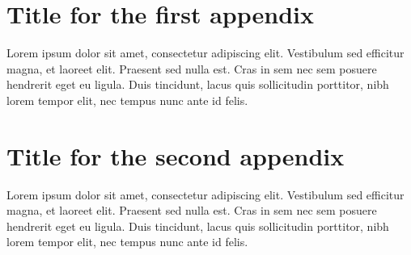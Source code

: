 \chapter{Title for the first appendix}
\label{appendixA}

Lorem ipsum dolor sit amet, consectetur adipiscing elit. Vestibulum sed efficitur magna, et laoreet elit. Praesent sed nulla est. Cras in sem nec sem posuere hendrerit eget eu ligula. Duis tincidunt, lacus quis sollicitudin porttitor, nibh lorem tempor elit, nec tempus nunc ante id felis.

\chapter{Title for the second appendix}
\label{appendixB}

Lorem ipsum dolor sit amet, consectetur adipiscing elit. Vestibulum sed efficitur magna, et laoreet elit. Praesent sed nulla est. Cras in sem nec sem posuere hendrerit eget eu ligula. Duis tincidunt, lacus quis sollicitudin porttitor, nibh lorem tempor elit, nec tempus nunc ante id felis.
